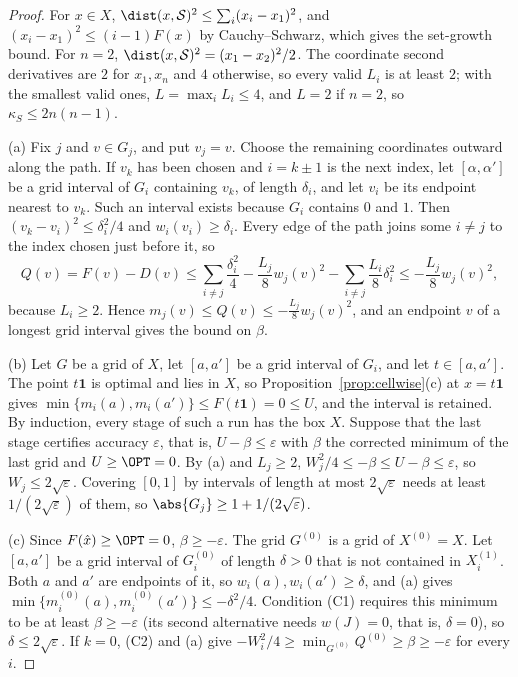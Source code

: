 \begin{proof}
For $x\in X$, $\dist(x,\mathcal S)^2\le\sum_i(x_i-x_1)^2$, and
$(x_i-x_1)^2\le(i-1)F(x)$ by Cauchy--Schwarz, which gives the set-growth
bound. For $n=2$, $\dist(x,\mathcal S)^2=(x_1-x_2)^2/2$. The coordinate second
derivatives are $2$ for $x_1,x_n$ and $4$ otherwise, so every valid $L_i$ is
at least $2$; with the smallest valid ones, $L=\max_iL_i\le4$, and $L=2$ if
$n=2$, so $\kappa_S\le2n(n-1)$.

(a) Fix $j$ and $v\in G_j$, and put $v_j=v$. Choose the remaining coordinates
outward along the path. If $v_k$ has been chosen and $i=k\pm1$ is the next
index, let $[\alpha,\alpha']$ be a grid interval of $G_i$ containing $v_k$, of
length $\delta_i$, and let $v_i$ be its endpoint nearest to $v_k$. Such an
interval exists because $G_i$ contains $0$ and $1$. Then
$(v_k-v_i)^2\le\delta_i^2/4$ and $w_i(v_i)\ge\delta_i$. Every edge of the
path joins some $i\ne j$ to the index chosen just before it, so
\[
Q(v)=F(v)-D(v)\le\sum_{i\ne j}\frac{\delta_i^2}4-\frac{L_j}8w_j(v)^2
-\sum_{i\ne j}\frac{L_i}8\delta_i^2\le-\frac{L_j}8w_j(v)^2,
\]
because $L_i\ge2$. Hence $m_j(v)\le Q(v)\le-\frac{L_j}8w_j(v)^2$, and an
endpoint $v$ of a longest grid interval gives the bound on $\beta$.

(b) Let $G$ be a grid of $X$, let $[a,a']$ be a grid interval of $G_i$, and
let $t\in[a,a']$. The point $t\mathbf1$ is optimal and lies in $X$, so
Proposition~\ref{prop:cellwise}(c) at $x=t\mathbf1$ gives
$\min\{m_i(a),m_i(a')\}\le F(t\mathbf1)=0\le U$, and the interval is
retained. By induction, every stage of such a run has the box $X$. Suppose that the
last stage certifies accuracy $\varepsilon$, that is, $U-\beta\le\varepsilon$
with $\beta$ the corrected minimum of the last grid and $U\ge\OPT=0$. By (a)
and $L_j\ge2$, $W_j^2/4\le-\beta\le U-\beta\le\varepsilon$, so
$W_j\le2\sqrt\varepsilon$. Covering $[0,1]$ by intervals of length at most
$2\sqrt\varepsilon$ needs at least $1/(2\sqrt\varepsilon)$ of them, so
$\abs{G_j}\ge1+1/(2\sqrt\varepsilon)$.

(c) Since $F(\hat x)\ge\OPT=0$, $\beta\ge-\varepsilon$. The grid $G^{(0)}$ is
a grid of $X^{(0)}=X$. Let $[a,a']$ be a grid interval of $G^{(0)}_i$ of
length $\delta>0$ that is not contained in $X^{(1)}_i$. Both $a$ and $a'$ are
endpoints of it, so $w_i(a),w_i(a')\ge\delta$, and (a) gives
$\min\{m^{(0)}_i(a),m^{(0)}_i(a')\}\le-\delta^2/4$. Condition (C1) requires
this minimum to be at least $\beta\ge-\varepsilon$ (its second alternative
needs $w(J)=0$, that is, $\delta=0$), so $\delta\le2\sqrt\varepsilon$. If
$k=0$, (C2) and (a) give $-W_i^2/4\ge\min_{G^{(0)}}Q^{(0)}\ge\beta\ge-\varepsilon$
for every $i$.
\end{proof}

